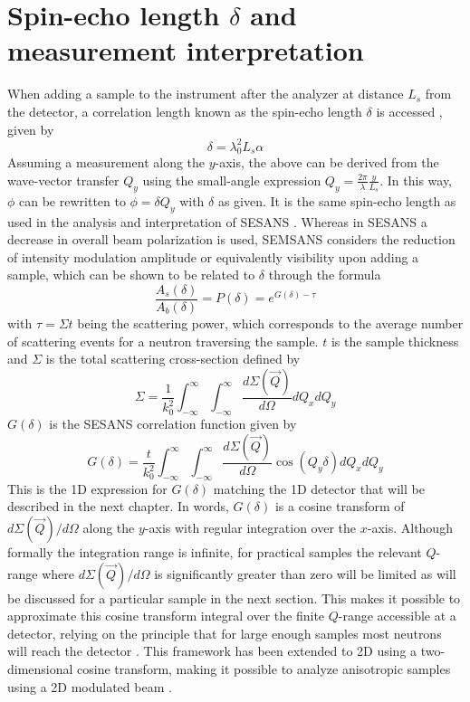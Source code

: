 \section{Spin-echo length $\delta$ and measurement interpretation}
\label{c2.3}
When adding a sample to the instrument after the analyzer at distance $L_s$ from the detector, a correlation length known as the spin-echo length $\delta$ is accessed \cite{bouwman2011}, given by 
\begin{equation}
	\delta = \lambda_0^2L_s\alpha \label{eq:delta}
\end{equation}
Assuming a measurement along the $y$-axis, the above can be derived from the wave-vector transfer $Q_y$ using the small-angle expression $Q_y = \frac{2\pi}{\lambda}\frac{y}{L_s}$. In this way, $\phi$ can be rewritten to $\phi = \delta Q_y$ with $\delta$ as given. It is the same spin-echo length as used in the analysis and interpretation of SESANS \cite{rekveldt1996}\cite{krouglov2003}\cite{andersson2008}. Whereas in SESANS a decrease in overall beam polarization is used, SEMSANS considers the reduction of intensity modulation amplitude or equivalently visibility upon adding a sample, which can be shown to be related to $\delta$ through the formula \cite{parnell2023}
\begin{equation}
	\frac{A_s(\delta)}{A_b(\delta)} = P(\delta) = e^{G(\delta) - \tau} \label{eq:sample-pol-reduction}
\end{equation}
with $\tau = \Sigma t$ being the scattering power, which corresponds to the average number of scattering events for a neutron traversing the sample. $t$ is the sample thickness and $\Sigma$ is the total scattering cross-section defined by 
\begin{equation}
	\Sigma = \frac{1}{k_0^2}\int_{-\infty}^\infty\int_{-\infty}^\infty\dfrac{d\Sigma(\vec{Q})}{d\Omega}dQ_xdQ_y  \label{eq:sigma-analytical}
\end{equation}
$G(\delta)$ is the SESANS correlation function given by
\begin{equation}
	G(\delta) = \frac{t}{k_0^2}\int_{-\infty}^\infty\int_{-\infty}^\infty\dfrac{d\Sigma(\vec{Q})}{d\Omega}\cos(Q_y \delta)dQ_xdQ_y  \label{eq:G-analytical}
\end{equation}
This is the 1D expression for $G(\delta)$ matching the 1D detector that will be described in the next chapter. In words, $G(\delta)$ is a cosine transform of $d\Sigma(\vec{Q})/d\Omega$ \cite{li2019} along the $y$-axis with regular integration over the $x$-axis. Although formally the integration range is infinite, for practical samples the relevant $Q$-range where $d\Sigma(\vec{Q})/d\Omega$ is significantly greater than zero will be limited as will be discussed for a particular sample in the next section. This makes it possible to approximate this cosine transform integral over the finite $Q$-range accessible at a detector, relying on the principle that for large enough samples most neutrons will reach the detector \cite{rekveldt1996}. This framework has been extended to 2D using a two-dimensional cosine transform, making it possible to analyze anisotropic samples using a 2D modulated beam \cite{parnell2023}.
